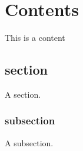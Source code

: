 \chapter{Contents}
\label{chap:contents}

This is a content

\section{section}
A section.
\subsection{subsection}
A subsection.





\newpage

